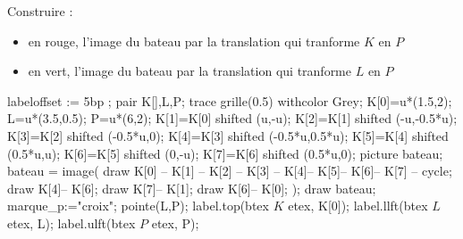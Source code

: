 \begin{exercice*}
    Construire :
    \begin{itemize}
        \item en rouge, l'image du bateau par la translation qui tranforme $K$ en $P$
        \item en vert, l'image du bateau par la translation qui tranforme $L$ en $P$
    \end{itemize}
    \begin{Geometrie}[CoinHD={(8u,4u)}]
        labeloffset := 5bp ;
        pair K[],L,P;                    
        trace grille(0.5) withcolor Grey;
        K[0]=u*(1.5,2);
        L=u*(3.5,0.5);
        P=u*(6,2);
        K[1]=K[0] shifted (u,-u);
        K[2]=K[1] shifted (-u,-0.5*u);
        K[3]=K[2] shifted (-0.5*u,0);
        K[4]=K[3] shifted (-0.5*u,0.5*u);
        K[5]=K[4] shifted (0.5*u,u);
        K[6]=K[5] shifted (0,-u);
        K[7]=K[6] shifted (0.5*u,0);
        picture bateau;
        bateau = image( 
            draw K[0] -- K[1] -- K[2] -- K[3] -- K[4]-- K[5]-- K[6]-- K[7] -- cycle;
            draw K[4]-- K[6];
            draw K[7]-- K[1];
            draw K[6]-- K[0];
        );
        draw bateau;
        marque_p:="croix";
        pointe(L,P);
        label.top(btex $K$ etex, K[0]);
        label.llft(btex $L$ etex, L);
        label.ulft(btex $P$ etex, P);
    \end{Geometrie}
\end{exercice*}
